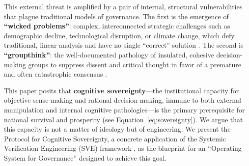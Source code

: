 \documentclass[11pt,a4paper]{article}
\begin{document}
This external threat is amplified by a pair of internal, structural vulnerabilities that plague traditional models of governance. The first is the emergence of \textbf{``wicked problems''}: complex, interconnected strategic challenges such as demographic decline, technological disruption, or climate change, which defy traditional, linear analysis and have no single ``correct'' solution \citep{Rittel1973}. The second is \textbf{``groupthink''}: the well-documented pathology of insulated, cohesive decision-making groups to suppress dissent and critical thought in favor of a premature and often catastrophic consensus \citep{Janis1982}.

This paper posits that \textbf{cognitive sovereignty}—the institutional capacity for objective sense-making and rational decision-making, immune to both external manipulation and internal cognitive pathologies—is the primary prerequisite for national survival and prosperity (see Equation~\eqref{eq:sovereignty}). We argue that this capacity is not a matter of ideology but of engineering. We present the Protocol for Cognitive Sovereignty, a concrete application of the Systemic Verification Engineering (SVE) framework \citep{Kovnatsky2025SVE2}, as the blueprint for an ``Operating System for Governance'' designed to achieve this goal.
\end{document}
